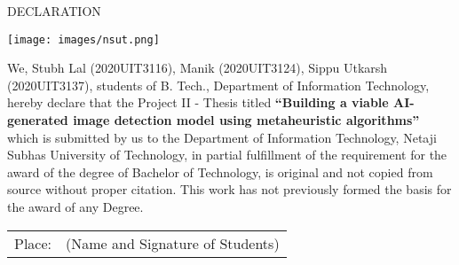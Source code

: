\thispagestyle{plain}
\begin{center}
\large \large {DECLARATION}

\end{center}
\begin{center}
   \texttt{[image: images/nsut.png]} 
\end{center}

\begin{center}
  \fontsize{12pt}{24pt}\selectfont{Department of Information technology\\Delhi-110078, India } 
 
\end{center}
\vspace{0.3cm}
\fontsize{12pt}{24pt}\selectfont We, Stubh Lal (2020UIT3116), Manik (2020UIT3124), Sippu Utkarsh (2020UIT3137),  students of B. Tech., Department of Information  Technology, hereby declare that the Project II - Thesis titled \textbf{“Building a viable AI-generated image detection model using metaheuristic algorithms” }which is submitted  by us to the Department of Information Technology, Netaji Subhas University of Technology,  in partial fulfillment of the requirement for the award of the degree of Bachelor of Technology, is  original and not copied from source without proper citation. This work has not previously formed  the basis for the award of any Degree. 

\vspace{2.0cm}


\begin{tabu} to \textwidth { X[l] X[c] }

Place: & (Name and Signature of Students) 
 
\end{tabu}

\fontsize{12pt}{24pt}\selectfont{Date: } 


\newpage
